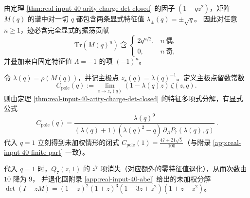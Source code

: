 \begin{corollary}\label{cor:real-input-40-arity-charge-sqrtq}
由定理 \ref{thm:real-input-40-arity-charge-det-closed} 的因子 $(1-qz^2)$，矩阵 $M(q)$ 的谱中对一切 $q$ 都包含两条显式特征值
\(
\lambda_\pm(q)=\pm\sqrt q
\)。
因此对任意 $n\ge 1$，迹必含完全显式的振荡贡献
\[
\mathrm{Tr}(M(q)^n)\ \text{含}\ 
\begin{cases}
2q^{n/2},&n\ \text{偶},\\
0,&n\ \text{奇},
\end{cases}
\]
并叠加来自固定特征值 $\Lambda=-1$ 的项 $(-1)^n$。
\end{corollary}

\begin{proposition}[主极点留数常数的代数闭式]\label{prop:real-input-40-arity-charge-residue}
令 $\lambda(q)=\rho(M(q))$，并记主极点 $z_\star(q)=\lambda(q)^{-1}$。定义主极点留数常数
\[
C_{\mathrm{pole}}(q):=\lim_{z\to z_\star(q)}(1-\lambda(q)z)\,\zeta(z,q).
\]
则由定理 \ref{thm:real-input-40-arity-charge-det-closed} 的特征多项式分解，有显式公式
\[
\boxed{\ 
C_{\mathrm{pole}}(q)=\frac{\lambda(q)^9}{(\lambda(q)+1)(\lambda(q)^2-q)\,\partial_\Lambda P_7(\lambda(q),q)}\ }.
\]
代入 $q=1$ 立刻得到未加权情形的闭式 $C_{\mathrm{pole}}(1)=\frac{47+21\sqrt5}{100}$（与附录 \ref{app:real-input-40-finite-part} 一致）。
\end{proposition}

\begin{remark}[在 $q=1$ 处与未加权行列式严格对接]
代入 $q=1$ 时，$Q_7(z,1)$ 的 $z^7$ 项消失（对应额外的零特征值退化），从而次数由 $10$ 降为 $9$，
并退化回附录 \ref{app:real-input-40-abel} 给出的未加权分解
\(
\det(I-zM)=(1-z)^2(1+z)^3(1-3z+z^2)(1+z-z^2)
\)。
\end{remark}

